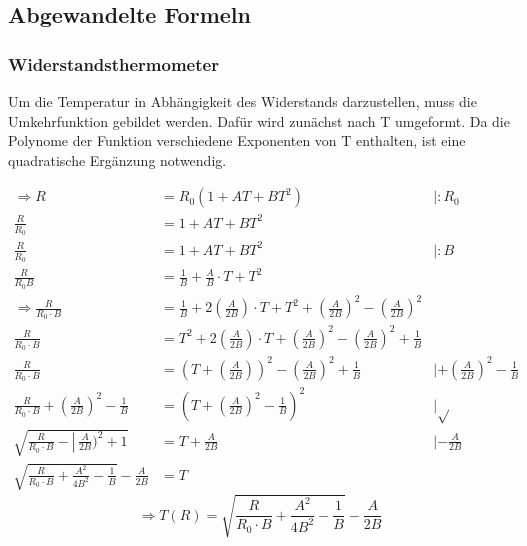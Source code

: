 \documentclass[a4paper,12pt]{article}
\begin{document}
\subsection{Abgewandelte Formeln}
\subsubsection*{Widerstandsthermometer}
Um die Temperatur in Abhängigkeit des Widerstands darzustellen, muss die Umkehrfunktion gebildet werden. Dafür wird zunächst nach T umgeformt. Da die Polynome der Funktion verschiedene Exponenten von T enthalten, ist eine quadratische Ergänzung notwendig.

\begin{equation*}
\begin{aligned}
\Rightarrow R&=R_{0}\left(1+A T+B T^{2}\right) 
&| : R_{0} 
\\ 
\frac{R}{R_{0}}&=1+A T+B T^{2} 
\\ 
\frac{R}{R_{0}}&=1+A T+B T^{2}
&| : B
\\ 
\frac{R}{R_{0} B}&=\frac{1}{B}+\frac{A}{B} \cdot T+T^{2} 
\\ 
\Rightarrow \frac{R}{R_{0} \cdot B}&=\frac{1}{B}+2\left(\frac{A}{2 B}\right) \cdot T+T^{2}+\left(\frac{A}{2 B}\right)^{2}-\left(\frac{A}{2 B}\right)^{2} 
&\phantom{|}
\\ 
\frac{R}{R_{0} \cdot B}&=T^{2}+2\left(\frac{A}{2 B}\right) \cdot T+\left(\frac{A}{2 B}\right)^{2}-\left(\frac{A}{2 B}\right)^{2}+\frac{1}{B} 
&\phantom{|}
\\ 
\frac{R}{R_{0} \cdot B}&=
 \left(T+\left(\frac{A}{2 B}\right)\right)^{2}-\left(\frac{A}{2 B}\right)^{2}+\frac{1}{B}
 &| +\left(\frac{A}{2 B}\right)^{2} -\frac{1}{B} 
\\ 
\frac{R}{R_{0} \cdot B}+\left(\frac{A}{2 B}\right)^{2}-\frac{1}{B}&=\left(T+\left(\frac{A}{2 B}\right)^{2}-\frac{1}{B}\right)^{2} 
&| \sqrt{}
\\ 
\sqrt{\left.\frac{R}{R_{0} \cdot B}-\left\lvert\, \frac{A}{2 B}\right.\right.)^{2}+1}&=T+\frac{A}{2 B}
&| -\frac{A}{2 B} 
\\ 
\sqrt{\frac{R}{R_{0} \cdot B}+\frac{A^{2}}{4 B^{2}}-\frac{1}{B}}-\frac{A}{2 B}&=T
&\phantom{|}
\end{aligned}
\end{equation*}
\begin{equation}
\Rightarrow T(R)=\sqrt{\frac{R}{R_{0} \cdot B}+\frac{A^{2}}{4 B^{2}}-\frac{1}{B}}-\frac{A}{2 B}
\label{tab:t-r}
\end{equation}
\end{document}

